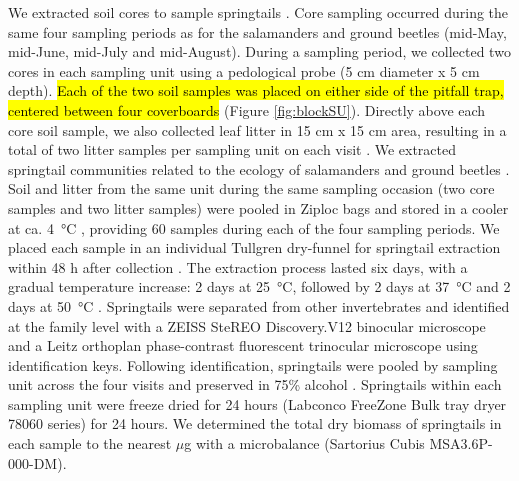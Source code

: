We extracted soil cores to sample springtails \citep{pongeVerticalDistributionCollembola2000,salamonEffectsPlantDiversity2004,chauvatChangesSoilFaunal2011a,farskaManagementIntensityAffects2014}. 
Core sampling occurred during the same four sampling periods as for the salamanders and ground beetles (mid-May, mid-June, mid-July and mid-August). 
During a sampling period, we collected two cores in each sampling unit using a pedological probe (5 cm diameter x 5 cm depth). 
\hl{Each of the two soil samples was placed on either side of the pitfall trap, centered between four coverboards} (Figure \ref{fig:blockSU}). 
Directly above each core soil sample, we also collected leaf litter in 15 cm x 15 cm area, resulting in a total of two litter samples per sampling unit on each visit \citep{raymond-leonardSpringtailCommunityStructure2018a,rousseauForestFloorMesofauna2018}.  
We extracted springtail communities related to the ecology of salamanders and ground beetles \citep{edwardsAssessmentPopulationsSoilinhabiting1991,chauvatChangesSoilFaunal2011a,raymond-leonardSpringtailCommunityStructure2018a,rousseauForestFloorMesofauna2018}. 
Soil and litter from the same unit during the same sampling occasion (two core samples and two litter samples) were pooled in Ziploc\up{\texttrademark{}} bags and stored in a cooler at ca. 4 °C \citep{chauvatChangesSoilFaunal2011a,rousseauForestFloorMesofauna2018}, providing 60 samples during each of the four sampling periods. 
We placed each sample in an individual Tullgren dry-funnel for springtail extraction within 48 h after collection \citep{rusekBiodiversityCollembolaTheir1998,wuCompositionSpatiotemporalVariation2014,rousseauForestFloorMesofauna2018}. 
The extraction process lasted six days, with a gradual temperature increase: 2 days at 25 °C, followed by 2 days at 37 °C and 2 days at 50 °C \citep{raymond-leonardSpringtailCommunityStructure2018a}. 
Springtails were separated from other invertebrates and identified at the family level with a ZEISS SteREO Discovery.V12 binocular microscope and a Leitz orthoplan phase-contrast fluorescent trinocular microscope using \cite{bellingerChecklistCollembolaWorld1996} identification keys. 
Following identification, springtails were pooled by sampling unit across the four visits and preserved in 75\% alcohol \citep{wuCompositionSpatiotemporalVariation2014}. 
Springtails within each sampling unit were freeze dried for 24 hours (Labconco FreeZone Bulk tray dryer 78060 series) for 24 hours. 
We determined the total dry biomass of springtails in each sample to the nearest $\mu$g with a microbalance (Sartorius Cubis\up{\texttrademark{}} MSA3.6P-000-DM).

